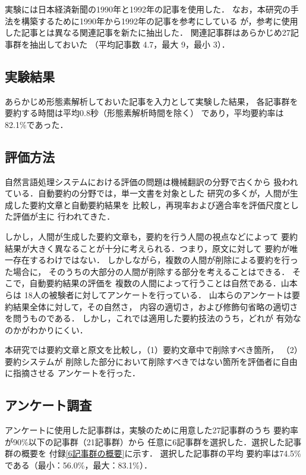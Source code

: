 実験には日本経済新聞の1990年と1992年の記事を使用した．
なお，本研究の手法を構築するために1990年から1992年の記事を参考にしている
が，参考に使用した記事とは異なる関連記事を新たに抽出した．
関連記事群はあらかじめ27記事群を抽出しておいた
（平均記事数 4.7，最大 9，最小 3）．
\subsection{実験結果}
あらかじめ形態素解析しておいた記事を入力として実験した結果，
各記事群を要約する時間は平均0.8秒（形態素解析時間を除く）
であり，平均要約率は82.1\%であった．

\subsection{評価方法}
自然言語処理システムにおける評価の問題は機械翻訳の分野で古くから
扱われている\cite{Margaret96}．自動要約の分野では，単一文書を対象とした
研究の多くが，人間が生成した要約文章と自動要約結果を
比較し，再現率および適合率を評価尺度とした評価が主に
行われてきた\cite{Okumura98}．

しかし，人間が生成した要約文章も，要約を行う人間の視点などによって
要約結果が大きく異なることが十分に考えられる．つまり，原文に対して
要約が唯一存在するわけではない．
しかしながら，複数の人間が削除による要約を行った場合に，
そのうちの大部分の人間が削除する部分を考えることはできる．
そこで，自動要約結果の評価を
複数の人間によって行うことは自然である．山本らは
18人の被験者に対してアンケートを行っている\cite{Yamamoto95a}．
山本らのアンケートは要約結果全体に対して，その自然さ，
内容の適切さ，および修飾句省略の適切さを問うものである．
しかし，これでは適用した要約技法のうち，どれが
有効なのかがわかりにくい．

本研究では要約文章と原文を比較し，（1）要約文章中で削除すべき箇所，
（2）要約システムが
削除した部分において削除すべきではない箇所を評価者に自由に指摘させる
アンケートを行った．

\subsection{アンケート調査}
アンケートに使用した記事群は，実験のために用意した27記事群のうち
要約率が90\%以下の記事群（21記事群）から
任意に6記事群を選択した．選択した記事群の概要を
付録\ref{6記事群の概要}に示す．
選択した記事群の平均
要約率は74.5\%である（最小：56.0\%，最大：83.1\%）．

